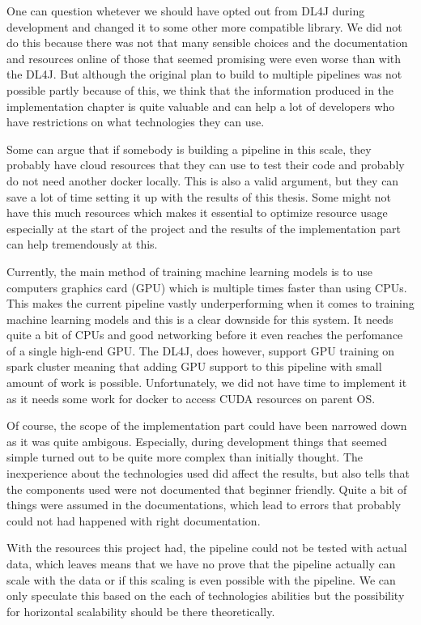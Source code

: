 One can question whetever we should have opted out from DL4J during development and changed it to some other more compatible library.
We did not do this because there was not that many sensible choices and the documentation and resources online of those that seemed promising were even worse than with the DL4J.
But although the original plan to build to multiple pipelines was not possible partly because of this, we think that the information produced in the implementation chapter is quite valuable and can help a lot of developers who have restrictions on what technologies they can use.

Some can argue that if somebody is building a pipeline in this scale, they probably have cloud resources that they can use to test their code and probably do not need another docker locally.
This is also a valid argument, but they can save a lot of time setting it up with the results of this thesis.
Some might not have this much resources which makes it essential to optimize resource usage especially at the start of the project and the results of the implementation part can help tremendously at this.

Currently, the main method of training machine learning models is to use computers graphics card (GPU) which is multiple times faster than using CPUs.
This makes the current pipeline vastly underperforming when it comes to training machine learning models and this is a clear downside for this system.
It needs quite a bit of CPUs and good networking before it even reaches the perfomance of a single high-end GPU.
The DL4J, does however, support GPU training on spark cluster meaning that adding GPU support to this pipeline with small amount of work is possible.
Unfortunately, we did not have time to implement it as it needs some work for docker to access CUDA resources on parent OS.

Of course, the scope of the implementation part could have been narrowed down as it was quite ambigous.
Especially, during development things that seemed simple turned out to be quite more complex than initially thought.
The inexperience about the technologies used did affect the results, but also tells that the components used were not documented that beginner friendly.
Quite a bit of things were assumed in the documentations, which lead to errors that probably could not had happened with right documentation.

With the resources this project had, the pipeline could not be tested with actual data, which leaves means that we have no prove that the pipeline actually can scale with the data or if this scaling is even possible with the pipeline.
We can only speculate this based on the each of technologies abilities but the possibility for horizontal scalability should be there theoretically.

